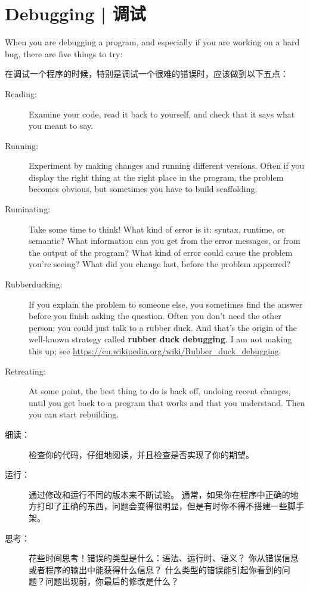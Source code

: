 {\section{Debugging  |  调试}
When you are debugging a program, and especially if you are
working on a hard bug, there are five things to try:

在调试一个程序的时候，特别是调试一个很难的错误时，应该做到以下五点：

\begin{description}
\item[Reading:] Examine your code, read it back to yourself, and
check that it says what you meant to say.
\item[Running:] Experiment by making changes and running different
versions.  Often if you display the right thing at the right place
in the program, the problem becomes obvious, but sometimes you have to
build scaffolding.
\item[Ruminating:] Take some time to think!  What kind of error
is it: syntax, runtime, or semantic?  What information can you get from
the error messages, or from the output of the program?  What kind of
error could cause the problem you're seeing?  What did you change
last, before the problem appeared?
\item[Rubberducking:] If you explain the problem to someone else, you
  sometimes find the answer before you finish asking the question.
  Often you don't need the other person; you could just talk to a rubber
  duck.  And that's the origin of the well-known strategy called {\bf
    rubber duck debugging}.  I am not making this up; see
  \url{https://en.wikipedia.org/wiki/Rubber_duck_debugging}.
\item[Retreating:] At some point, the best thing to do is back
off, undoing recent changes, until you get back to a program that
works and that you understand.  Then you can start rebuilding.
\end{description}

\begin{description}

\item [细读：]检查你的代码，仔细地阅读，并且检查是否实现了你的期望。

\item [运行：]通过修改和运行不同的版本来不断试验。  通常，如果你在程序中正确的地方打印了正确的东西，问题会变得很明显，但是有时你不得不搭建一些脚手架。

\item [思考：]    花些时间思考！错误的类型是什么：语法、运行时、语义？
    你从错误信息或者程序的输出中能获得什么信息？
    什么类型的错误能引起你看到的问题？问题出现前，你最后的修改是什么？


\end{description}}
